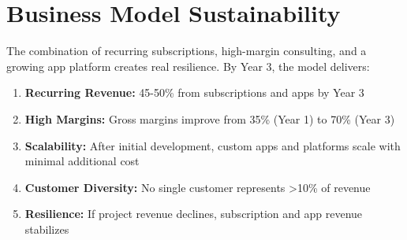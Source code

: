 \section{Business Model Sustainability}

The combination of recurring subscriptions, high-margin consulting, and a growing app platform creates real resilience. By Year 3, the model delivers:

\begin{importantbox}
    \begin{enumerate}
        \item \textbf{Recurring Revenue:} 45-50\% from subscriptions and apps by Year 3
        \item \textbf{High Margins:} Gross margins improve from 35\% (Year 1) to 70\% (Year 3)
        \item \textbf{Scalability:} After initial development, custom apps and platforms scale with minimal additional cost
        \item \textbf{Customer Diversity:} No single customer represents >10\% of revenue
        \item \textbf{Resilience:} If project revenue declines, subscription and app revenue stabilizes
    \end{enumerate}
\end{importantbox}


